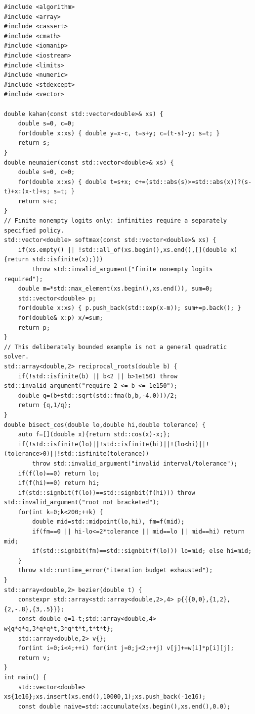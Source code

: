 \begin{verbatim}
#include <algorithm>
#include <array>
#include <cassert>
#include <cmath>
#include <iomanip>
#include <iostream>
#include <limits>
#include <numeric>
#include <stdexcept>
#include <vector>

double kahan(const std::vector<double>& xs) {
    double s=0, c=0;
    for(double x:xs) { double y=x-c, t=s+y; c=(t-s)-y; s=t; }
    return s;
}
double neumaier(const std::vector<double>& xs) {
    double s=0, c=0;
    for(double x:xs) { double t=s+x; c+=(std::abs(s)>=std::abs(x))?(s-t)+x:(x-t)+s; s=t; }
    return s+c;
}
// Finite nonempty logits only: infinities require a separately specified policy.
std::vector<double> softmax(const std::vector<double>& xs) {
    if(xs.empty() || !std::all_of(xs.begin(),xs.end(),[](double x){return std::isfinite(x);}))
        throw std::invalid_argument("finite nonempty logits required");
    double m=*std::max_element(xs.begin(),xs.end()), sum=0;
    std::vector<double> p;
    for(double x:xs) { p.push_back(std::exp(x-m)); sum+=p.back(); }
    for(double& x:p) x/=sum;
    return p;
}
// This deliberately bounded example is not a general quadratic solver.
std::array<double,2> reciprocal_roots(double b) {
    if(!std::isfinite(b) || b<2 || b>1e150) throw std::invalid_argument("require 2 <= b <= 1e150");
    double q=(b+std::sqrt(std::fma(b,b,-4.0)))/2;
    return {q,1/q};
}
double bisect_cos(double lo,double hi,double tolerance) {
    auto f=[](double x){return std::cos(x)-x;};
    if(!std::isfinite(lo)||!std::isfinite(hi)||!(lo<hi)||!(tolerance>0)||!std::isfinite(tolerance))
        throw std::invalid_argument("invalid interval/tolerance");
    if(f(lo)==0) return lo;
    if(f(hi)==0) return hi;
    if(std::signbit(f(lo))==std::signbit(f(hi))) throw std::invalid_argument("root not bracketed");
    for(int k=0;k<200;++k) {
        double mid=std::midpoint(lo,hi), fm=f(mid);
        if(fm==0 || hi-lo<=2*tolerance || mid==lo || mid==hi) return mid;
        if(std::signbit(fm)==std::signbit(f(lo))) lo=mid; else hi=mid;
    }
    throw std::runtime_error("iteration budget exhausted");
}
std::array<double,2> bezier(double t) {
    constexpr std::array<std::array<double,2>,4> p{{{0,0},{1,2},{2,-.8},{3,.5}}};
    const double q=1-t;std::array<double,4> w{q*q*q,3*q*q*t,3*q*t*t,t*t*t};
    std::array<double,2> v{};
    for(int i=0;i<4;++i) for(int j=0;j<2;++j) v[j]+=w[i]*p[i][j];
    return v;
}
int main() {
    std::vector<double> xs{1e16};xs.insert(xs.end(),10000,1);xs.push_back(-1e16);
    const double naive=std::accumulate(xs.begin(),xs.end(),0.0);

\end{verbatim}
